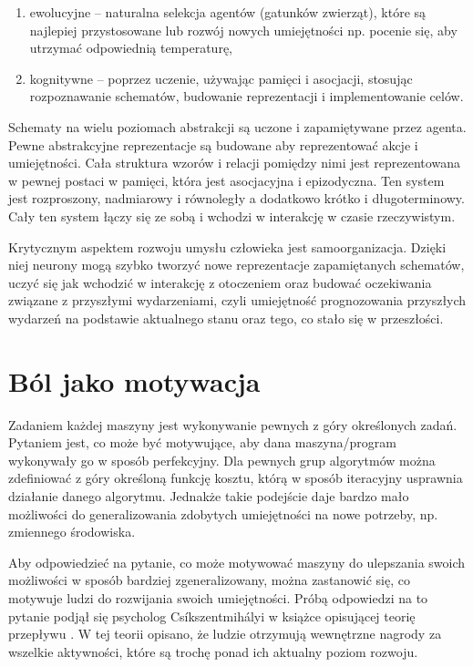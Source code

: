 \begin{enumerate}
	\item ewolucyjne -- naturalna selekcja agentów (gatunków zwierząt), które 
	są najlepiej przystosowane lub rozwój nowych umiejętności np. pocenie się, 
	aby utrzymać odpowiednią temperaturę,
	
	\item kognitywne -- poprzez uczenie, używając pamięci i asocjacji, stosując 
	rozpoznawanie schematów, budowanie reprezentacji i implementowanie celów.
\end{enumerate}

Schematy na wielu poziomach abstrakcji są uczone i zapamiętywane przez agenta. 
Pewne abstrakcyjne reprezentacje są budowane aby reprezentować akcje i 
umiejętności. Cała struktura wzorów i relacji pomiędzy nimi jest reprezentowana 
w pewnej postaci w pamięci, która jest asocjacyjna i epizodyczna. Ten system 
jest rozproszony, nadmiarowy i równoległy a dodatkowo krótko i długoterminowy. 
Cały ten system łączy się ze sobą i wchodzi w interakcję w czasie rzeczywistym.

Krytycznym aspektem rozwoju umysłu człowieka jest samoorganizacja. Dzięki niej 
neurony mogą szybko tworzyć nowe reprezentacje zapamiętanych schematów, uczyć 
się jak wchodzić w interakcję z otoczeniem oraz budować oczekiwania związane z 
przyszłymi wydarzeniami, czyli umiejętność prognozowania przyszłych wydarzeń na 
podstawie aktualnego stanu oraz tego, co stało się w przeszłości.

\section{Ból jako motywacja}

Zadaniem każdej maszyny jest wykonywanie pewnych z góry określonych zadań. 
Pytaniem jest, co może być motywujące, aby dana maszyna/program wykonywały go w 
sposób perfekcyjny. Dla pewnych grup algorytmów można zdefiniować z góry 
określoną funkcję kosztu, którą w sposób iteracyjny usprawnia działanie danego 
algorytmu. Jednakże takie podejście daje bardzo mało możliwości do 
generalizowania zdobytych umiejętności na nowe potrzeby, np. zmiennego 
środowiska.

Aby odpowiedzieć na pytanie, co może motywować maszyny do ulepszania swoich 
możliwości w sposób bardziej zgeneralizowany, można zastanowić się, co motywuje 
ludzi do rozwijania swoich umiejętności. Próbą odpowiedzi na to pytanie podjął 
się psycholog Csíkszentmihályi w książce opisującej teorię przepływu 
\cite{csikszentmihalyi1996creativity}. W tej teorii opisano, że ludzie 
otrzymują wewnętrzne nagrody za wszelkie aktywności, które są trochę ponad ich 
aktualny poziom rozwoju. 

